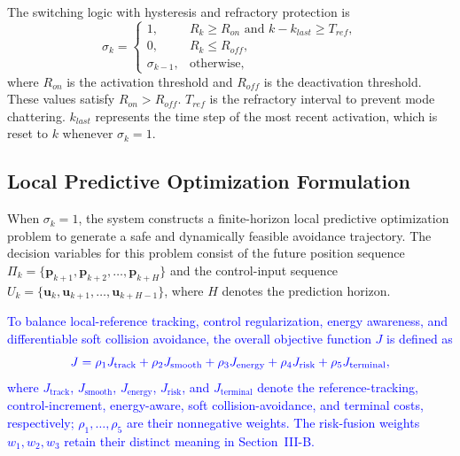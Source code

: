 \documentclass[lettersize,journal]{IEEEtran}
\newcommand{\vect}[1]{\boldsymbol{#1}}
\begin{document}
The switching logic with hysteresis and refractory protection is
\begin{equation}
	\sigma_k=
	\begin{cases}
		1, & R_k \ge R_{on} \text{ and } k - k_{last} \ge T_{ref},\\
		0, & R_k \le R_{off},\\
		\sigma_{k-1}, & \text{otherwise},
	\end{cases}
	\label{eq:trigger}
\end{equation}
where $R_{on}$ is the activation threshold and $R_{off}$ is the deactivation threshold. These values satisfy $R_{on} > R_{off}$. $T_{ref}$ is the refractory interval to prevent mode chattering. $k_{last}$ represents the time step of the most recent activation, which is reset to $k$ whenever $\sigma_k = 1$.

\subsection{Local Predictive Optimization Formulation}

When $\sigma_k=1$, the system constructs a finite-horizon local predictive optimization problem to generate a safe and dynamically feasible avoidance trajectory. The decision variables for this problem consist of the future position sequence $\Pi_k = \{\vect{p}_{k+1}, \vect{p}_{k+2}, \ldots, \vect{p}_{k+H}\}$ and the control-input sequence $U_k = \{\vect{u}_k, \vect{u}_{k+1}, \ldots, \vect{u}_{k+H-1}\}$, where $H$ denotes the prediction horizon.

\textcolor{blue}{To balance local-reference tracking, control regularization, energy awareness, and differentiable soft collision avoidance, the overall objective function $J$ is defined as}
\begin{equation}
	\small
	\textcolor{blue}{J = \rho_1 J_{\text{track}} + \rho_2 J_{\text{smooth}} + \rho_3 J_{\text{energy}} + \rho_4 J_{\text{risk}} + \rho_5 J_{\text{terminal}},}
	\label{eq:total_cost}
\end{equation}
\textcolor{blue}{where $J_{\text{track}}$, $J_{\text{smooth}}$, $J_{\text{energy}}$, $J_{\text{risk}}$, and $J_{\text{terminal}}$ denote the reference-tracking, control-increment, energy-aware, soft collision-avoidance, and terminal costs, respectively; $\rho_1,\ldots,\rho_5$ are their nonnegative weights. The risk-fusion weights $w_1,w_2,w_3$ retain their distinct meaning in Section~III-B.}
\end{document}

